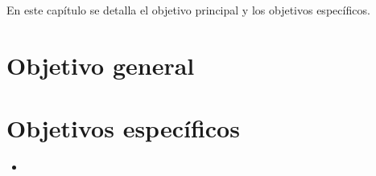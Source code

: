 \documentclass[../main/main.tex]{subfiles}
\begin{document}
\espacio

  En este capítulo se detalla el objetivo principal y los objetivos específicos.

  \section{Objetivo general}

  


  \section{Objetivos específicos}

  \begin{itemize}
    \item 
  \end{itemize}
\end{document}
